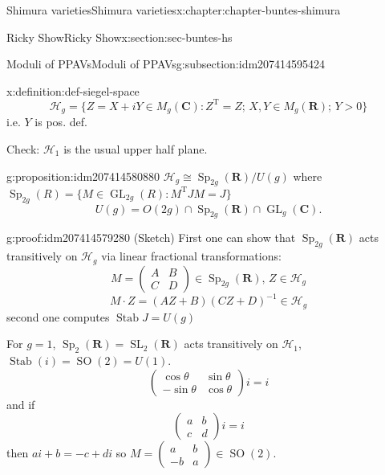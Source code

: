 \documentclass[oneside,10pt,]{book}
\numberwithin{equation}{section}
\newcommand{\inv}{^{-1}}
\newcommand{\RR}{\mathbf{R}}
\newcommand{\CC}{\mathbf{C}}
\newcommand{\transpose}{\mathrm{T}}
\DeclareMathOperator{\Stab}{Stab}
\DeclareMathOperator{\SL}{SL}
\DeclareMathOperator{\GL}{GL}
\DeclareMathOperator{\specialorthogonal}{SO}
\DeclareMathOperator{\Sp}{Sp}
\newcommand{\gt}{>}
\newcommand{\amp}{&}
\begin{document}
\begin{chapterptx}{Shimura varieties}{}{Shimura varieties}{}{}{x:chapter:chapter-buntes-shimura}
\begin{sectionptx}{Ricky Show}{}{Ricky Show}{}{}{x:section:sec-buntes-hs}
\begin{subsectionptx}{Moduli of PPAVs}{}{Moduli of PPAVs}{}{}{g:subsection:idm207414595424}
\begin{definition}{}{x:definition:def-siegel-space}
\begin{equation*}
\mathscr H_g = \{ Z = X+iY \in M_g(\CC) : Z^\transpose  = Z ; \, X,Y \in M_g(\RR); \, Y \gt 0\}
\end{equation*}
i.e. \(Y\) is pos. def.%
\end{definition}
Check: \(\mathscr H_1\) is the usual upper half plane.%
\begin{proposition}{}{}{g:proposition:idm207414580880}%
\(\mathscr H_g \cong \Sp_{2g}(\RR)/U(g)\) where \(\Sp_{2g} (R) = \{ M \in \GL_{2g}(R) : M^\transpose J M = J\}\)%
\begin{equation*}
U(g) = O(2g) \cap \Sp_{2g}(\RR) \cap \GL_{g}(\CC)\text{.}
\end{equation*}
%
\end{proposition}
\begin{proofptx}{}{g:proof:idm207414579280}
(Sketch) First one can show that \(\Sp_{2g}(\RR)\) acts transitively on \(\mathscr H_g\) via linear fractional transformations:%
\begin{equation*}
M = \begin{pmatrix} A\amp B\\ C\amp D\end{pmatrix} \in \Sp_{2g}(\RR),\, Z\in \mathscr H_g
\end{equation*}
%
\begin{equation*}
M\cdot Z = (AZ+B)(CZ+D)\inv \in \mathscr H_g
\end{equation*}
second one computes \(\Stab J = U(g)\)%
\par
For \(g= 1\), \(\Sp_2(\RR) = \SL_2(\RR)\) acts transitively on \(\mathscr H_1\), \(\Stab(i) = \specialorthogonal (2) = U(1)\).%
\begin{equation*}
\begin{pmatrix} \cos \theta\amp \sin \theta \\ - \sin \theta \amp \cos \theta \end{pmatrix} i = i
\end{equation*}
and if%
\begin{equation*}
\begin{pmatrix} a \amp b \\ c \amp d\end{pmatrix} i = i
\end{equation*}
then \(ai + b = -c + di\) so \(M= \begin{pmatrix} a\amp b\\ -b \amp a \end{pmatrix}\in \specialorthogonal(2)\).%
\end{proofptx}

\end{subsectionptx}
\end{sectionptx}
\end{chapterptx}
\end{document}
